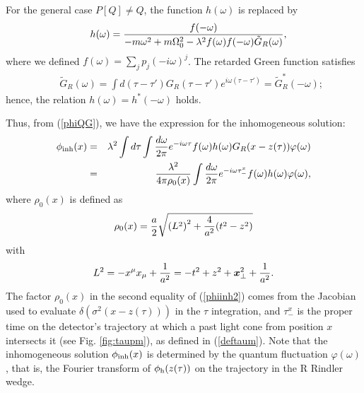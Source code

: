 \documentclass[aps,prd,preprintnumbers,nofootinbib,showpacs,11pt]{revtex4}%
\begin{document}
\begin{widetext}
For the general case $P[Q]\neq Q$, the function $h(\omega)$ is replaced by
\begin{eqnarray}
&&h(\omega)={f(-\omega)\over -m\omega^2+m\Omega_0^2-\lambda^2f(\omega)f(-\omega)\tilde G_R(\omega)}, 
\label{defhomega}
\end{eqnarray}
where we defined $f(\omega)=\sum_j p_j(-i\omega)^j$. The retarded Green function satisfies
\begin{eqnarray}
&&\tilde G_R(\omega)= \int d(\tau-\tau') G_R(\tau-\tau') e^{i\omega(\tau-\tau')}=\tilde G_R^*(-\omega);
\label{deftildeGR}
\end{eqnarray}
hence, the relation $h(\omega)=h^*(-\omega)$ holds. 

Thus, from (\ref{phiQG}), we have the expression for the inhomogeneous solution: 
\begin{eqnarray}
\phi_{\rm inh}(x)&=&\lambda^2 \int d\tau\int {d\omega\over2\pi}e^{-i\omega\tau}
f(\omega)h(\omega)G_R(x-z(\tau))\varphi(\omega)
\nonumber\\
&=&{\lambda^2 \over 4\pi \rho_0(x)}\int {d\omega\over2\pi}e^{-i\omega\tau_-^x}
f(\omega)h(\omega)\varphi(\omega),
\label{phiinh2}
\end{eqnarray}
where $\rho_0(x)$ is defined as 
\begin{eqnarray}
\rho_0(x)={a\over 2}\sqrt{\left(L^2\right)^2+{4\over a^2}(t^2-z^2)}
\label{defrho0}
\end{eqnarray}
with
\begin{eqnarray}
L^2=-x^\mu x_\mu+{1\over a^2}=-t^2+z^2+\bm x_\perp^2+{1\over a^2}. 
\end{eqnarray}
The factor $\rho_0(x)$ in the second equality of (\ref{phiinh2})  
comes from the Jacobian used to evaluate $\delta(\sigma^2(x-z(\tau)))$ 
in the $\tau$ integration, and $\tau_-^x$ is the proper time on the detector's trajectory at which
a past light cone from position $x$ intersects it (see Fig. \ref{fig:taupm}), 
as defined in (\ref{deftaum}).
Note that the inhomogeneous solution $\phi_{\rm inh}(x)$ is determined by 
the quantum fluctuation $\varphi(\omega)$, that is, the Fourier transform of 
 $\phi_{\rm h}(z(\tau))$ on the trajectory in the R Rindler wedge.


\end{widetext}
\end{document}

